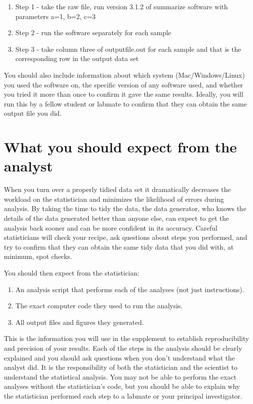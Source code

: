 \documentclass[12pt]{article}
\providecommand{\tightlist}{%
  \setlength{\itemsep}{0pt}\setlength{\parskip}{0pt}}
\begin{document}
\begin{enumerate}
\def\labelenumi{\arabic{enumi}.}
\tightlist
\item
  Step 1 - take the raw file, run version 3.1.2 of summarize software
  with parameters a=1, b=2, c=3
\item
  Step 2 - run the software separately for each sample
\item
  Step 3 - take column three of outputfile.out for each sample and that
  is the corresponding row in the output data set
\end{enumerate}

You should also include information about which system
(Mac/Windows/Linux) you used the software on, the specific version of
any software used, and whether you tried it more than once to confirm it
gave the same results. Ideally, you will run this by a fellow student or
labmate to confirm that they can obtain the same output file you did.

\section{What you should expect from the
analyst}\label{what-you-should-expect-from-the-analyst}

When you turn over a properly tidied data set it dramatically decreases
the workload on the statistician and minimizes the likelihood of errors
during analysis. By taking the time to tidy the data, the data
generator, who knows the details of the data generated better than
anyone else, can expect to get the analysis back sooner and can be more
confident in its accuracy. Careful statisticians will check your recipe,
ask questions about steps you performed, and try to confirm that they
can obtain the same tidy data that you did with, at minimum, spot
checks.

You should then expect from the statistician:

\begin{enumerate}
\def\labelenumi{\arabic{enumi}.}
\tightlist
\item
  An analysis script that performs each of the analyses (not just
  instructions).
\item
  The exact computer code they used to run the analysis.
\item
  All output files and figures they generated.
\end{enumerate}

This is the information you will use in the supplement to establish
reproducibility and precision of your results. Each of the steps in the
analysis should be clearly explained and you should ask questions when
you don't understand what the analyst did. It is the responsibility of
both the statistician and the scientist to understand the statistical
analysis. You may not be able to perform the exact analyses without the
statistician's code, but you should be able to explain why the
statistician performed each step to a labmate or your principal
investigator.
\end{document}
